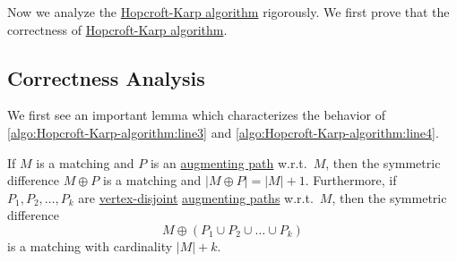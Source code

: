 Now we analyze the \hyperref[algo:Hopcroft-Karp-algorithm]{Hopcroft-Karp algorithm} rigorously. We first prove that the correctness of \hyperref[algo:Hopcroft-Karp-algorithm]{Hopcroft-Karp algorithm}.

\subsection{Correctness Analysis}
We first see an important lemma which characterizes the behavior of \autoref{algo:Hopcroft-Karp-algorithm:line3} and \autoref{algo:Hopcroft-Karp-algorithm:line4}.
\begin{lemma}\label{lma:lec25-1}
	If \(M\) is a matching and \(P\) is an \hyperref[def:augmenting-path]{augmenting path} w.r.t.\ \(M\), then the symmetric difference
	\(M\oplus P\) is a matching and \(\left\vert M\oplus P \right\vert = \left\vert M \right\vert + 1\). Furthermore, if
	\(P_1, P_2, \ldots  , P_k\) are \hyperref[def:vertex-independent]{vertex-disjoint} \hyperref[def:augmenting-path]{augmenting paths}
	w.r.t.\ \(M\), then the symmetric difference
	\[
		M\oplus(P_1 \cup P_2 \cup  \ldots  \cup  P_k  )
	\]
	is a matching with cardinality \(\left\vert M \right\vert + k\).
\end{lemma}
